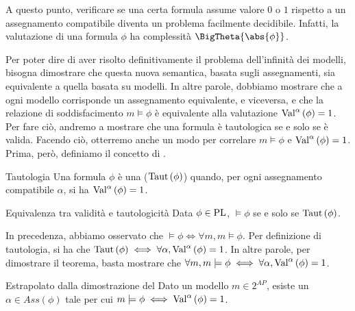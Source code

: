 A questo punto, verificare se una certa formula assume valore \(0\) o \(1\) rispetto a un assegnamento compatibile diventa un problema facilmente decidibile. 
Infatti, la valutazione di una formula \(\phi\) ha complessità \(\BigTheta{\abs{\phi}}\).

Per poter dire di aver risolto definitivamente il problema dell'infinità dei modelli, bisogna dimostrare che questa nuova semantica, basata sugli assegnamenti, sia equivalente a quella basata su modelli. 
In altre parole, dobbiamo mostrare che a ogni modello corrisponde un assegnamento equivalente, e viceversa, e che la relazione di soddisfacimento \(m \models \phi\) è equivalente alla valutazione \(\Val{\alpha}[\phi] = 1\).
Per fare ciò, andremo a mostrare che una formula è tautologica se e solo se è valida. 
Facendo ciò, otterremo anche un modo per correlare \(m \models \phi\) e \(\Val{\alpha}[\phi] = 1\).
Prima, però, definiamo il concetto di .

\begin{definition}{Tautologia}
  Una formula \(\phi\) è una  (\(\Taut[\phi]\)) quando, per ogni assegnamento compatibile \(\alpha\), si ha \(\Val{\alpha}[\phi]=1\).
\end{definition}

\begin{theorem}[label=thm:validity-equals-taut]{Equivalenza tra validità e tautologicità}
  Data \(\phi \in \operatorname{PL}\), \(\models \phi \) se e solo se \(\Taut[\phi]\).
\end{theorem}

In precedenza, abbiamo osservato che \(\models \phi \iff \forall m, m \models \phi\).
Per definizione di tautologia, si ha che
\(\Taut[\phi]\iff\forall \alpha ,\Val{\alpha}[\phi] = 1\).
In altre parole, per dimostrare il teorema, basta mostrare che \(\forall m, m \models \phi \iff \forall \alpha, \Val{\alpha}[\phi] =1\).

\begin{lemma}[listtitle={Estrapolato dalla dimostrazione del \Cref{thm:validity-equals-taut}}]{\infosymbol{} Estrapolato dalla dimostrazione del }
  Dato un modello \(m \in 2^{AP}\), esiste un \(\alpha \in Ass(\phi)\) tale per cui \(m \models \phi \iff \Val{\alpha}[\phi]=1\).
\end{lemma}


